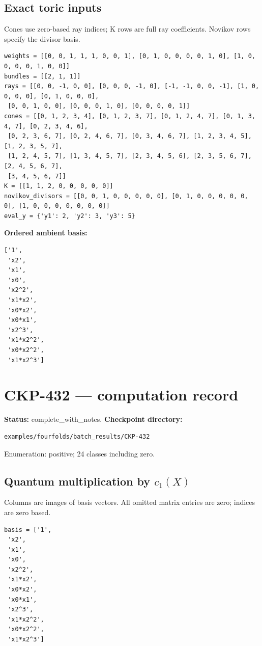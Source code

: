 \documentclass[10pt,a4paper]{article}
\begin{document}
\subsection*{Exact toric inputs}
Cones use zero-based ray indices; K rows are full ray coefficients. Novikov rows specify the divisor basis.

\begin{lstlisting}
weights = [[0, 0, 1, 1, 1, 0, 0, 1], [0, 1, 0, 0, 0, 0, 1, 0], [1, 0, 0, 0, 0, 1, 0, 0]]
bundles = [[2, 1, 1]]
rays = [[0, 0, -1, 0, 0], [0, 0, 0, -1, 0], [-1, -1, 0, 0, -1], [1, 0, 0, 0, 0], [0, 1, 0, 0, 0],
 [0, 0, 1, 0, 0], [0, 0, 0, 1, 0], [0, 0, 0, 0, 1]]
cones = [[0, 1, 2, 3, 4], [0, 1, 2, 3, 7], [0, 1, 2, 4, 7], [0, 1, 3, 4, 7], [0, 2, 3, 4, 6],
 [0, 2, 3, 6, 7], [0, 2, 4, 6, 7], [0, 3, 4, 6, 7], [1, 2, 3, 4, 5], [1, 2, 3, 5, 7],
 [1, 2, 4, 5, 7], [1, 3, 4, 5, 7], [2, 3, 4, 5, 6], [2, 3, 5, 6, 7], [2, 4, 5, 6, 7],
 [3, 4, 5, 6, 7]]
K = [[1, 1, 2, 0, 0, 0, 0, 0]]
novikov_divisors = [[0, 0, 1, 0, 0, 0, 0, 0], [0, 1, 0, 0, 0, 0, 0, 0], [1, 0, 0, 0, 0, 0, 0, 0]]
eval_y = {'y1': 2, 'y2': 3, 'y3': 5}
\end{lstlisting}

\textbf{Ordered ambient basis:}
\begin{lstlisting}
['1',
 'x2',
 'x1',
 'x0',
 'x2^2',
 'x1*x2',
 'x0*x2',
 'x0*x1',
 'x2^3',
 'x1*x2^2',
 'x0*x2^2',
 'x1*x2^3']
\end{lstlisting}

\clearpage\section*{CKP-432 --- computation record}
\textbf{Status:} complete\_with\_notes.
\textbf{Checkpoint directory:}
\begin{lstlisting}
examples/fourfolds/batch_results/CKP-432
\end{lstlisting}

Enumeration: positive; 24 classes including zero.
\subsection*{Quantum multiplication by $c_1(X)$}
Columns are images of basis vectors. All omitted matrix entries are zero; indices are zero based.

\begin{lstlisting}
basis = ['1',
 'x2',
 'x1',
 'x0',
 'x2^2',
 'x1*x2',
 'x0*x2',
 'x0*x1',
 'x2^3',
 'x1*x2^2',
 'x0*x2^2',
 'x1*x2^3']
\end{lstlisting}
\end{document}
